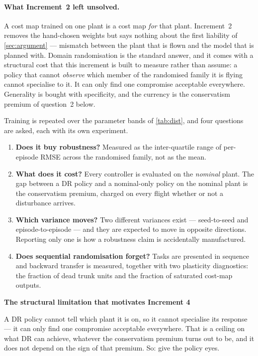 \documentclass[11pt,a4paper,twoside,openright]{report}
\theoremstyle{plain}
\theoremstyle{definition}
\theoremstyle{remark}
\newcommand{\keyhead}[1]{\textbf{\sffamily\small\textcolor{NavyDeep}{#1}}\par\vspace{2pt}}
\begin{document}
	\paragraph{What Increment~2 left unsolved.} A cost map trained on one plant is a
	cost map \emph{for} that plant. Increment~2 removes the hand-chosen weights but
	says nothing about the first liability of \cref{sec:argument} --- mismatch
	between the plant that is flown and the model that is planned with. Domain
	randomisation is the standard answer, and it comes with a structural cost that
	this increment is built to measure rather than assume: a policy that cannot
	\emph{observe} which member of the randomised family it is flying cannot
	specialise to it. It can only find one compromise acceptable everywhere.
	Generality is bought with specificity, and the currency is the conservatism
	premium of question~2 below.

	Training is repeated over the parameter bands of \cref{tab:dist}, and four
	questions are asked, each with its own experiment.

	\begin{enumerate}[leftmargin=*]
		\item \textbf{Does it buy robustness?} Measured as the inter-quartile range of
		per-episode RMSE across the randomised family, not as the mean.
		\item \textbf{What does it cost?} Every controller is evaluated on the
		\emph{nominal} plant. The gap between a DR policy and a nominal-only policy on
		the nominal plant is the conservatism premium, charged on every flight whether
		or not a disturbance arrives.
		\item \textbf{Which variance moves?} Two different variances exist ---
		seed-to-seed and episode-to-episode --- and they are expected to move in
		opposite directions. Reporting only one is how a robustness claim is
		accidentally manufactured.
		\item \textbf{Does sequential randomisation forget?} Tasks are presented in
		sequence and backward transfer is measured, together with two plasticity
		diagnostics: the fraction of dead trunk units and the fraction of saturated
		cost-map outputs.
	\end{enumerate}

	\begin{keybox}
		\keyhead{The structural limitation that motivates Increment 4}
		A DR policy cannot tell which plant it is on, so it cannot specialise its
		response --- it can only find one compromise acceptable everywhere. That is a
		ceiling on what DR can achieve, whatever the conservatism premium turns out to
		be, and it does not depend on the sign of that premium. So: give the policy
		eyes.
	\end{keybox}
\end{document}
